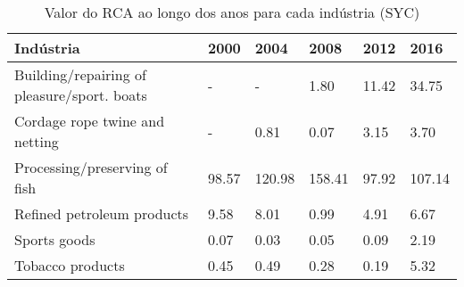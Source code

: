 \begin{table}
\centering
\caption{Valor do RCA ao longo dos anos para cada indústria (SYC)}
\label{tab:ex3-tempo-SYC}
\begin{tabular}{p{6cm}p{1.5cm}p{1.5cm}p{1.5cm}p{1.5cm}p{1.5cm}}
\toprule
                                  Indústria &  2000 &   2004 &   2008 &  2012 &   2016 \\
\midrule
Building/repairing of pleasure/sport. boats &     - &      - &   1.80 & 11.42 &  34.75 \\
             Cordage rope twine and netting &     - &   0.81 &   0.07 &  3.15 &   3.70 \\
              Processing/preserving of fish & 98.57 & 120.98 & 158.41 & 97.92 & 107.14 \\
                 Refined petroleum products &  9.58 &   8.01 &   0.99 &  4.91 &   6.67 \\
                               Sports goods &  0.07 &   0.03 &   0.05 &  0.09 &   2.19 \\
                           Tobacco products &  0.45 &   0.49 &   0.28 &  0.19 &   5.32 \\
\bottomrule
\end{tabular}
\end{table}
